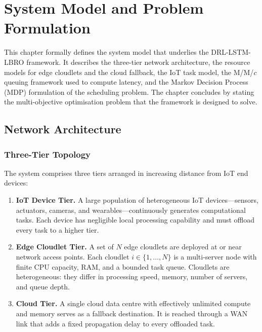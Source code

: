\chapter{System Model and Problem Formulation}
\label{chap:sysmodel}

This chapter formally defines the system model that underlies the
DRL-LSTM-LBRO framework. It describes the three-tier network
architecture, the resource models for edge cloudlets and the cloud
fallback, the IoT task model, the M/M/$c$ queuing framework used to
compute latency, and the Markov Decision Process (MDP) formulation
of the scheduling problem. The chapter concludes by stating the
multi-objective optimisation problem that the framework is designed
to solve.

\section{Network Architecture}
\label{sec:network_arch}

\subsection{Three-Tier Topology}

The system comprises three tiers arranged in increasing distance
from IoT end devices:

\begin{enumerate}
  \item \textbf{IoT Device Tier.} A large population of
  heterogeneous IoT devices---sensors, actuators, cameras, and
  wearables---continuously generates computational tasks. Each
  device has negligible local processing capability and must
  offload every task to a higher tier.

  \item \textbf{Edge Cloudlet Tier.} A set of $N$ edge cloudlets
  are deployed at or near network access points. Each cloudlet $i
  \in \{1, \ldots, N\}$ is a multi-server node with finite CPU
  capacity, RAM, and a bounded task queue. Cloudlets are
  heterogeneous: they differ in processing speed, memory, number
  of servers, and queue depth.

  \item \textbf{Cloud Tier.} A single cloud data centre with
  effectively unlimited compute and memory serves as a fallback
  destination. It is reached through a WAN link that adds a fixed
  propagation delay to every offloaded task.
\end{enumerate}

